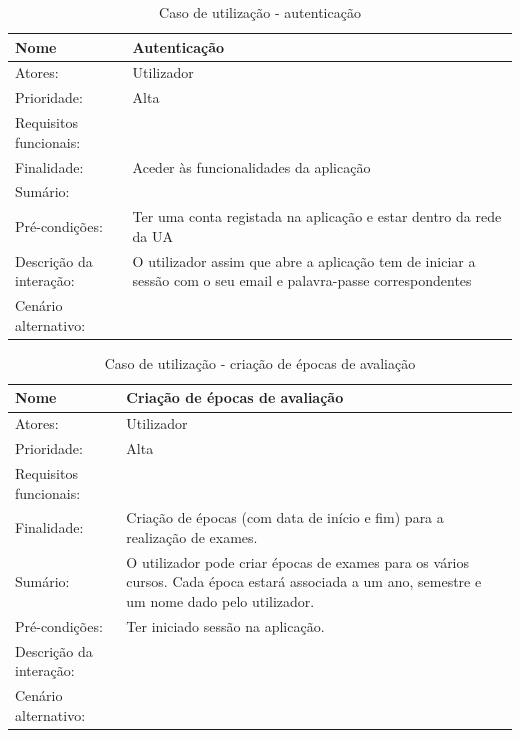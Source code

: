\documentclass[11pt, twoside]{report}
\begin{document}
	
		
	\begin{table}[H]
		\caption{Caso de utilização - autenticação}
		\begin{center}	
			\begin{tabularx}{\textwidth}{|l|X|}
				\hline
				\textbf{Nome }	& \textbf{Autenticação} \\
				\hline
				Atores: & Utilizador \\
				\hline
				Prioridade: & Alta \\
				\hline
				Requisitos funcionais:&  \\
				\hline
				Finalidade: & Aceder às funcionalidades da aplicação\\
				\hline
				Sumário: &  \\
				\hline
				Pré-condições: & Ter uma conta registada na aplicação e estar dentro da rede da UA\\
				\hline
				Descrição da interação: &  O utilizador assim que abre a aplicação tem de iniciar a sessão com o seu email e palavra-passe correspondentes\\
				\hline
				Cenário alternativo:&\\
				\hline
			\end{tabularx}
		\end{center}
	\end{table}

\begin{table}[H]
	\caption{Caso de utilização - criação de épocas de avaliação}
	\begin{center}	
		\begin{tabularx}{\textwidth}{|l|X|}
			\hline
			\textbf{Nome }	& \textbf{Criação de épocas de avaliação} \\
			\hline
			Atores: & Utilizador\\
			\hline
			Prioridade: &  Alta\\
			\hline
			Requisitos funcionais:&  \\
			\hline
			Finalidade: & Criação de épocas (com data de início e fim) para a realização de exames. \\
			\hline
			Sumário: & O utilizador pode criar épocas de exames para os vários cursos. Cada época estará associada a um ano, semestre e um nome dado pelo utilizador.\\
			\hline
			Pré-condições: & Ter iniciado sessão na aplicação.\\
			\hline
			Descrição da interação: &  \\
			\hline
			Cenário alternativo: &\\
			\hline
		\end{tabularx}
	\end{center}
\end{table}
\end{document}
